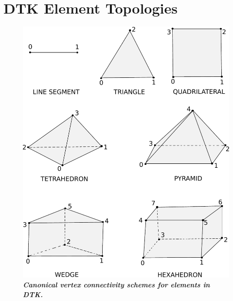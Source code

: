 \documentclass[letterpaper,12pt]{article}
\begin{document}
\clearpage




\clearpage

\appendix
\section{DTK Element Topologies}\label{apdx:cell_topo}

\begin{figure}[htpb!]
  \centering
  \includegraphics[width=5.5in]{Linear_Elements.pdf}
  \caption{\bf \sl Canonical vertex connectivity schemes for elements
    in DTK.}
  \label{fig:linear_elements}
\end{figure}

\clearpage

\end{document}
